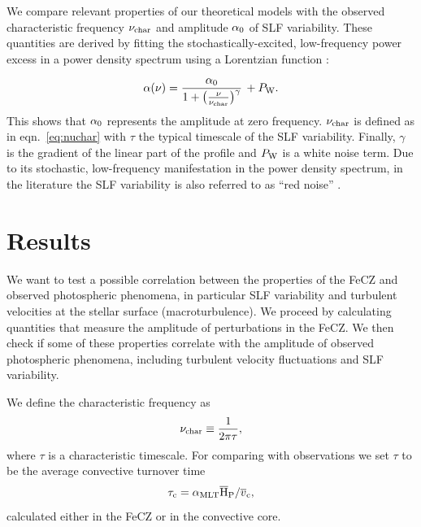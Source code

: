 \documentclass[twocolumn]{aastex63}
\begin{document}
We compare relevant properties of our theoretical models  with the observed characteristic frequency $\nu_{\rm char}$ and amplitude $\alpha_0$ of SLF variability. These quantities are derived by fitting the stochastically-excited, low-frequency power excess in a power
density spectrum using a Lorentzian function \citep[e.g.][]{Bowman:2019}:

\begin{equation}\label{eq:rednoise}
\alpha(\nu) = \frac{\alpha_0}{1+\big(\frac{\nu}{\nu_{\rm char}}\big)^{\gamma}} \, + P_{\rm W}.
\end{equation}
This shows that $\alpha_0$ represents the amplitude at zero
frequency. $\nu_{\rm char}$ is defined as in eqn.~\ref{eq:nuchar} with $\tau$ the typical timescale of the SLF variability.  
Finally, $\gamma$ is the gradient of the linear part of the profile and $P_{\rm W}$ is a white noise term.
Due to its stochastic, low-frequency manifestation in the power density spectrum, in the literature the SLF variability is also referred to as ``red noise'' \citep[e.g.][]{Blomme:2011}.



\section{Results}
We want to test a possible correlation between the properties of the FeCZ and observed photospheric phenomena, in particular SLF variability and turbulent velocities at the stellar surface (macroturbulence).
We proceed by calculating quantities that measure the amplitude of perturbations in the FeCZ. We then check if some of these properties correlate with the amplitude of observed photospheric phenomena, including turbulent velocity fluctuations and SLF variability.  

We define the characteristic frequency as 
\begin{equation}\label{eq:nuchar}
\nu_{\rm char} \equiv \frac{1}{2\pi\tau},
\end{equation}
where $\tau$ is a characteristic timescale.
For  comparing with observations we set $\tau$ to be the average convective turnover time 
\begin{equation}\label{eq:turnover}
\tau_{\rm c} = \alpha_{\rm MLT} \overline{\mathrm{H}}_{\mathrm P} / \overline{v}_{\rm c},
\end{equation}
calculated either in the FeCZ or in the convective core.  
\end{document}
